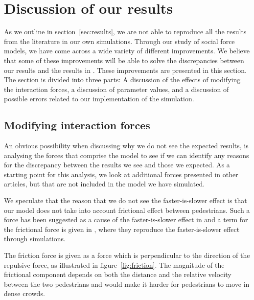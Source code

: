 \section{Discussion of our results}
\label{sec:discussion}
As we outline in section~\ref{sec:results}, we are not able to reproduce all
the results from the literature in our own simulations.  Through our study of
social force models, we have come across a wide variety of different
improvements. We believe that some of these improvements will be able to solve
the discrepancies between our results and the results in \cite{self-org}.
These improvements are presented in this section.  The section is divided into
three parts: A discussion of the effects of modifying  the interaction forces,
a discussion of parameter values, and a discussion of possible errors related
to our implementation of the simulation.

\subsection{Modifying interaction forces}
\label{sec:new-forces}
An obvious possibility when discussing why we do not see the expected results,
is analysing the forces that comprise the model to see if we can identify any
reasons for the discrepancy between the results we see and those we expected.
As a starting point for this analysis, we look at additional forces presented
in other articles, but that are not included in the model we have simulated.

We speculate that the reason that we do not see the faster-is-slower effect is
that our model does not take into account frictional effect between
pedestrians.  Such a force has been suggested as a cause of the
faster-is-slower effect in \cite{HelbingNew} and a term for the frictional
force is given in \cite{helbing00}, where they reproduce the faster-is-slower
effect through simulations.

The friction force is given as a force which is perpendicular to the direction
of the repulsive force, as illustrated in  figure~\ref{fig:friction}. The
magnitude of the frictional component depends on both the distance and the
relative velocity between the two pedestrians and would make it harder for
pedestrians to move in dense crowds.

